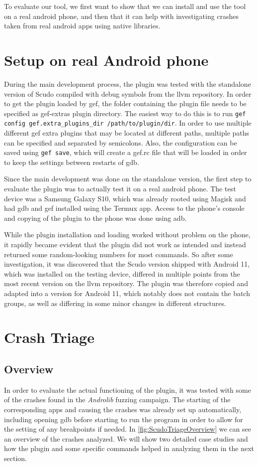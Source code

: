 \documentclass[a4paper,11pt,oneside]{report}
\begin{document}
To evaluate our tool, we first want to show that we can install and use the
tool on a real android phone, and then that it can help with investigating
crashes taken from real android apps using native libraries.

\section{Setup on real Android phone}

During the main development process, the plugin was tested with the standalone
version of Scudo compiled with debug symbols from the llvm repository. In
order to get the plugin loaded by gef, the folder containing the plugin file
needs to be specified as gef-extras plugin directory. The easiest way to do this
is to run \verb|gef config gef.extra_plugins_dir /path/to/plugin/dir|. In order
to use multiple different gef extra plugins that may be located at different
paths, multiple paths can be specified and separated by semicolons. Also, the
configuration can be saved using \verb|gef save|, which will create a gef.rc file
that will be loaded in order to keep the settings between restarts of gdb.

Since the main development was done on the standalone version, the first step
to evaluate the plugin was to actually test it on a real android phone. The
test device was a Samsung Galaxy S10, which was already rooted using Magisk
and had gdb and gef installed using the Termux app. Access to the phone's
console and copying of the plugin to the phone was done using adb.

While the plugin installation and loading worked without problem on the phone, it
rapidly became evident that the plugin did not work as intended and instead
returned some random-looking numbers for most commands. So after some
investigation, it was discovered that the Scudo version shipped with Android
11, which was installed on the testing device, differed in multiple points
from the most recent version on the llvm repository. The plugin was therefore
copied and adapted into a version for Android 11, which notably does not
contain the batch groups, as well as differing in some minor changes in
different structures.

\section{Crash Triage}

\subsection{Overview}
In order to evaluate the actual functioning of the plugin, it was tested with
some of the crashes found in the \textit{Androlib} fuzzing campaign. 
The starting of the corresponding apps and causing the crashes was already
set up automatically, including opening gdb before starting to run the program
in order to allow for the setting of any breakpoints if needed. In
\autoref{fig:ScudoTriageOverview} we can see an overview of the crashes analyzed.
We will show two detailed case studies and how the plugin and some specific
commands helped in analyzing them in the next section.
\end{document}
